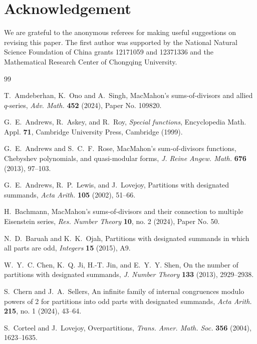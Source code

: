 \documentclass[11pt,reqno]{amsart}
\numberwithin{equation}{section}
\theoremstyle{plain}
\theoremstyle{definition}
\theoremstyle{named}
\begin{document}
\section*{Acknowledgement}
We are grateful to the anonymous referees for making useful suggestions on revising this paper. The first author was supported by the National Natural Science Foundation of China grants 12171059 and 12371336 and the Mathematical Research Center of Chongqing University.






\begin{thebibliography}{99}

T.~Amdeberhan, K.~Ono and A.~Singh, MacMahon's sums-of-divisors and allied $q$-series, {\it Adv. Math.} {\bf 452} (2024), Paper No. 109820.



 G.~E.~Andrews, R.~Askey, and R.~Roy, {\it Special functions}, Encyclopedia Math. Appl. {\bf 71}, Cambridge University Press, Cambridge (1999).

 G.~E.~Andrews and S.~C.~F.~Rose, MacMahon's sum-of-divisors functions, Chebyshev polynomials, and quasi-modular forms, {\it J. Reine Angew. Math.} {\bf 676} (2013), 97--103.

 G.~E.~Andrews, R.~P.~Lewis, and J.~Lovejoy, Partitions with designated summands, {\it Acta Arith.}  {\bf 105} (2002), 51--66.

H.~Bachmann, MacMahon's sums-of-divisors and their connection to multiple Eisenstein series, {\it Res. Number Theory} {\bf 10}, no. 2 (2024),  Paper No. 50.

  N.~D.~Baruah and K.~K.~Ojah, Partitions with designated summands in which all parts are odd, {\it Integers} {\bf 15} (2015), A9.



W.~Y.~C. Chen, K.~Q. Ji, H.-T. Jin, and E.~Y.~Y. Shen, On the number of partitions with designated summands, {\it J. Number Theory} {\bf 133} (2013), 2929--2938.  

 S.~Chern and J.~A.~Sellers, An infinite family of internal congruences modulo powers of 2 for partitions into odd parts with designated summands, {\it Acta Arith.} {\bf 215}, no. 1 (2024), 43--64.

 S.~Corteel and J.~Lovejoy, Overpartitions, {\it Trans. Amer. Math. Soc.} {\bf 356} (2004), 1623--1635.


\end{thebibliography}
\end{document}
